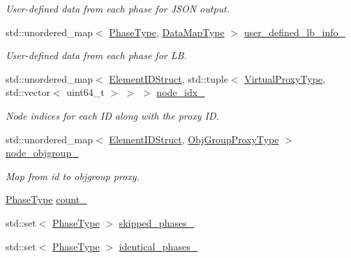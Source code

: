 \begin{DoxyCompactItemize}
\begin{DoxyCompactList}\small\item\em User-\/defined data from each phase for J\+S\+ON output. \end{DoxyCompactList}\item 
std\+::unordered\+\_\+map$<$ \hyperlink{namespacevt_a46ce6733d5cdbd735d561b7b4029f6d7}{Phase\+Type}, \hyperlink{namespacevt_1_1vrt_1_1collection_1_1balance_a5794b6bc763c88c78228074bd0d1a50f}{Data\+Map\+Type} $>$ \hyperlink{structvt_1_1vrt_1_1collection_1_1balance_1_1_l_b_data_holder_ad5b8a5a6093c4edd34a10069551c1d19}{user\+\_\+defined\+\_\+lb\+\_\+info\+\_\+}
\begin{DoxyCompactList}\small\item\em User-\/defined data from each phase for LB. \end{DoxyCompactList}\item 
std\+::unordered\+\_\+map$<$ \hyperlink{namespacevt_1_1vrt_1_1collection_1_1balance_a9f5b53fafb270212279a4757d2c4cd28}{Element\+I\+D\+Struct}, std\+::tuple$<$ \hyperlink{namespacevt_a1b417dd5d684f045bb58a0ede70045ac}{Virtual\+Proxy\+Type}, std\+::vector$<$ uint64\+\_\+t $>$ $>$ $>$ \hyperlink{structvt_1_1vrt_1_1collection_1_1balance_1_1_l_b_data_holder_a6b316a4e35ea98e592cbe875074aa6d8}{node\+\_\+idx\+\_\+}
\begin{DoxyCompactList}\small\item\em Node indices for each ID along with the proxy ID. \end{DoxyCompactList}\item 
std\+::unordered\+\_\+map$<$ \hyperlink{namespacevt_1_1vrt_1_1collection_1_1balance_a9f5b53fafb270212279a4757d2c4cd28}{Element\+I\+D\+Struct}, \hyperlink{namespacevt_ad7cae989df485fccca57f0792a880a8e}{Obj\+Group\+Proxy\+Type} $>$ \hyperlink{structvt_1_1vrt_1_1collection_1_1balance_1_1_l_b_data_holder_ab862d2f1b884256fc88634757f37bb80}{node\+\_\+objgroup\+\_\+}
\begin{DoxyCompactList}\small\item\em Map from id to objgroup proxy. \end{DoxyCompactList}\item 
\hyperlink{namespacevt_a46ce6733d5cdbd735d561b7b4029f6d7}{Phase\+Type} \hyperlink{structvt_1_1vrt_1_1collection_1_1balance_1_1_l_b_data_holder_ac7d4f40440b458c101af292dd3357558}{count\+\_\+}
\item 
std\+::set$<$ \hyperlink{namespacevt_a46ce6733d5cdbd735d561b7b4029f6d7}{Phase\+Type} $>$ \hyperlink{structvt_1_1vrt_1_1collection_1_1balance_1_1_l_b_data_holder_a66a5410c689d1515c9462495d3225a79}{skipped\+\_\+phases\+\_\+}
\item 
std\+::set$<$ \hyperlink{namespacevt_a46ce6733d5cdbd735d561b7b4029f6d7}{Phase\+Type} $>$ \hyperlink{structvt_1_1vrt_1_1collection_1_1balance_1_1_l_b_data_holder_a190018ee0726acb12d7d416476de5bfd}{identical\+\_\+phases\+\_\+}
\end{DoxyCompactItemize}
